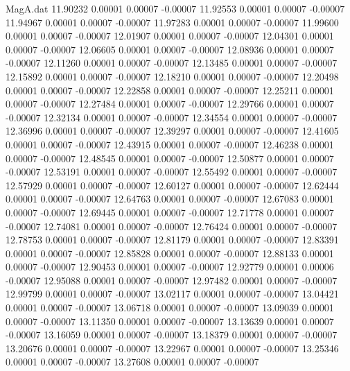 \begin{filecontents}{MagA.dat}
  11.90232    0.00001    0.00007   -0.00007
  11.92553    0.00001    0.00007   -0.00007
  11.94967    0.00001    0.00007   -0.00007
  11.97283    0.00001    0.00007   -0.00007
  11.99600    0.00001    0.00007   -0.00007
  12.01907    0.00001    0.00007   -0.00007
  12.04301    0.00001    0.00007   -0.00007
  12.06605    0.00001    0.00007   -0.00007
  12.08936    0.00001    0.00007   -0.00007
  12.11260    0.00001    0.00007   -0.00007
  12.13485    0.00001    0.00007   -0.00007
  12.15892    0.00001    0.00007   -0.00007
  12.18210    0.00001    0.00007   -0.00007
  12.20498    0.00001    0.00007   -0.00007
  12.22858    0.00001    0.00007   -0.00007
  12.25211    0.00001    0.00007   -0.00007
  12.27484    0.00001    0.00007   -0.00007
  12.29766    0.00001    0.00007   -0.00007
  12.32134    0.00001    0.00007   -0.00007
  12.34554    0.00001    0.00007   -0.00007
  12.36996    0.00001    0.00007   -0.00007
  12.39297    0.00001    0.00007   -0.00007
  12.41605    0.00001    0.00007   -0.00007
  12.43915    0.00001    0.00007   -0.00007
  12.46238    0.00001    0.00007   -0.00007
  12.48545    0.00001    0.00007   -0.00007
  12.50877    0.00001    0.00007   -0.00007
  12.53191    0.00001    0.00007   -0.00007
  12.55492    0.00001    0.00007   -0.00007
  12.57929    0.00001    0.00007   -0.00007
  12.60127    0.00001    0.00007   -0.00007
  12.62444    0.00001    0.00007   -0.00007
  12.64763    0.00001    0.00007   -0.00007
  12.67083    0.00001    0.00007   -0.00007
  12.69445    0.00001    0.00007   -0.00007
  12.71778    0.00001    0.00007   -0.00007
  12.74081    0.00001    0.00007   -0.00007
  12.76424    0.00001    0.00007   -0.00007
  12.78753    0.00001    0.00007   -0.00007
  12.81179    0.00001    0.00007   -0.00007
  12.83391    0.00001    0.00007   -0.00007
  12.85828    0.00001    0.00007   -0.00007
  12.88133    0.00001    0.00007   -0.00007
  12.90453    0.00001    0.00007   -0.00007
  12.92779    0.00001    0.00006   -0.00007
  12.95088    0.00001    0.00007   -0.00007
  12.97482    0.00001    0.00007   -0.00007
  12.99799    0.00001    0.00007   -0.00007
  13.02117    0.00001    0.00007   -0.00007
  13.04421    0.00001    0.00007   -0.00007
  13.06718    0.00001    0.00007   -0.00007
  13.09039    0.00001    0.00007   -0.00007
  13.11350    0.00001    0.00007   -0.00007
  13.13639    0.00001    0.00007   -0.00007
  13.16059    0.00001    0.00007   -0.00007
  13.18379    0.00001    0.00007   -0.00007
  13.20676    0.00001    0.00007   -0.00007
  13.22967    0.00001    0.00007   -0.00007
  13.25346    0.00001    0.00007   -0.00007
  13.27608    0.00001    0.00007   -0.00007

\end{filecontents}

